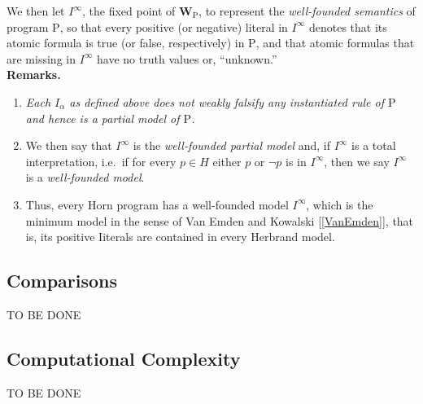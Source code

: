 We then let $I^\infty$, the fixed point of $\mathbf{W}_\mathrm{P}$, to represent the \emph{well-founded semantics} of program $\mathrm{P}$, so that every positive (or negative) literal in $I^\infty$ denotes that its atomic formula is true (or false, respectively) in $\mathrm{P}$, and that atomic formulas that are missing in $I^\infty$ have no truth values or, ``unknown.''
\medskip\\
\textbf{Remarks.}
\begin{enumerate}[label=(\alph*)]
%
\item \emph{Each $I_\alpha$ as defined above does not weakly falsify any instantiated rule of $\mathrm{P}$ and hence is a partial model of $\mathrm{P}$.}
%
\item We then say that $I^\infty$ is the \emph{well-founded partial model} and, if $I^\infty$ is a total interpretation, i.e.\ if for every $p \in H$ either $p$ or $\neg p$ is in $I^\infty$, then we say $I^\infty$ is a \emph{well-founded model}.
%
\item Thus, every Horn program has a well-founded model $I^\infty$, which is the minimum model in the sense of Van Emden and Kowalski [\ref{VanEmden}], that is, its positive Iiterals are contained in every Herbrand model.
%
\end{enumerate}
\subsection{Comparisons}
TO BE DONE
\subsection{Computational Complexity}
TO BE DONE